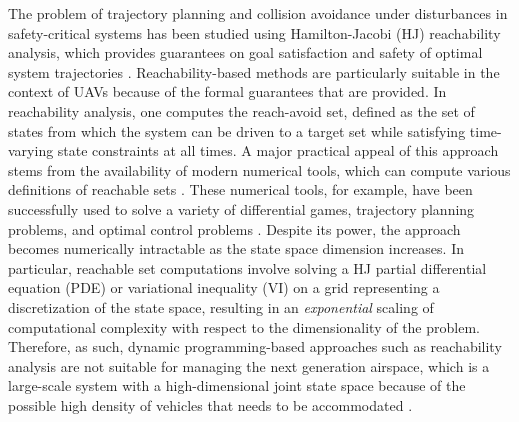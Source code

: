 The problem of trajectory planning and collision avoidance under disturbances in safety-critical systems has been studied using Hamilton-Jacobi (HJ) reachability analysis, which provides guarantees on goal satisfaction and safety of optimal system trajectories \cite{Barron90, Mitchell05, Bokanowski10, Bokanowski11, Margellos11, Fisac15}. Reachability-based methods are particularly suitable in the context of UAVs because of the formal guarantees that are provided. In reachability analysis, one computes the reach-avoid set, defined as the set of states from which the system can be driven to a target set while satisfying time-varying state constraints at all times. A major practical appeal of this approach stems from the availability of modern numerical tools, which can compute various definitions of reachable sets \cite{Sethian96, Osher02, Mitchell02, Mitchell07b}. These numerical tools, for example, have been successfully used to solve a variety of differential games, trajectory planning problems, and optimal control problems \cite{Bayen07, Ding08, Bouffard12, Huang11}. 
Despite its power, the approach becomes numerically intractable as the state space dimension increases. In particular, reachable set computations involve solving a HJ partial differential equation (PDE) or variational inequality (VI) on a grid representing a discretization of the state space, resulting in an \textit{exponential} scaling of computational complexity with respect to the dimensionality of the problem. Therefore, as such, dynamic programming-based approaches such as reachability analysis are not suitable for managing the next generation airspace, which is a large-scale system with a high-dimensional joint state space because of the possible high density of vehicles that needs to be accommodated \cite{Kopardekar16}.  

